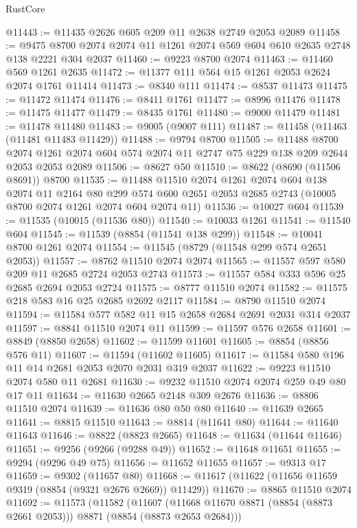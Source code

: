 \begin{lexlean}{RustCore}
\begin{coremodule}
@11443 := @11435 @2626 @605 @209 @11 @2638 @2749 @2053 @2089
@11458 := @9475 @8700 @2074 @2074 @11 @1261 @2074 @569 @604 @610 @2635 @2748 @138 @2221 @304 @2037
@11460 := @9223 @8700 @2074
@11463 := @11460 @569 @1261 @2635
@11472 := @11377 @111 @564 @15 @1261 @2053 @2624 @2074 @1761 @11414
@11473 := @8340 @111
@11474 := @8537 @11473
@11475 := @11472 @11474
@11476 := @8411 @1761
@11477 := @8996 @11476
@11478 := @11475 @11477
@11479 := @8435 @1761
@11480 := @9000 @11479
@11481 := @11478 @11480
@11483 := @9005 (@9007 @111)
@11487 := @11458 (@11463 (@11481 @11483 @11429))
@11488 := @9794 @8700
@11505 := @11488
    @8700
    @2074
    @1261
    @2074
    @604
    @574
    @2074
    @11
    @2747
    @75
    @229
    @138
    @209
    @2644
    @2053
    @2053
    @2089
@11506 := @8627 @50
@11510 := @8622 (@8690 (@11506 @8691)) @8700
@11535 := @11488
    @11510
    @2074
    @1261
    @2074
    @604
    @138
    @2074
    @11
    @2164
    @80
    @299
    @574
    @600
    @2651
    @2053
    @2685
    @2743
    (@10005 @8700 @2074 @1261 @2074 @604 @2074 @11)
@11536 := @10027 @604
@11539 := @11535 (@10015 (@11536 @80))
@11540 := @10033 @1261
@11541 := @11540 @604
@11545 := @11539 (@8854 (@11541 @138 @299))
@11548 := @10041 @8700 @1261 @2074
@11554 := @11545 (@8729 (@11548 @299 @574 @2651 @2053))
@11557 := @8762 @11510 @2074 @2074
@11565 := @11557 @597 @580 @209 @11 @2685 @2724 @2053 @2743
@11573 := @11557 @584 @333 @596 @25 @2685 @2694 @2053 @2724
@11575 := @8777 @11510 @2074
@11582 := @11575 @218 @583 @16 @25 @2685 @2692 @2117
@11584 := @8790 @11510 @2074
@11594 := @11584 @577 @582 @11 @15 @2658 @2684 @2691 @2031 @314 @2037
@11597 := @8841 @11510 @2074 @11
@11599 := @11597 @576 @2658
@11601 := @8849 (@8850 @2658)
@11602 := @11599 @11601
@11605 := @8854 (@8856 @576 @11)
@11607 := @11594 (@11602 @11605)
@11617 := @11584 @580 @196 @11 @14 @2681 @2053 @2070 @2031 @319 @2037
@11622 := @9223 @11510 @2074 @580 @11 @2681
@11630 := @9232 @11510 @2074 @2074 @259 @49 @80 @17 @11
@11634 := @11630 @2665 @2148 @309 @2676
@11636 := @8806 @11510 @2074
@11639 := @11636 @80 @50 @80
@11640 := @11639 @2665
@11641 := @8815 @11510
@11643 := @8814 (@11641 @80)
@11644 := @11640 @11643
@11646 := @8822 (@8823 @2665)
@11648 := @11634 (@11644 @11646)
@11651 := @9256 (@9266 (@9288 @49))
@11652 := @11648 @11651
@11655 := @9294 (@9296 @49 @75)
@11656 := @11652 @11655
@11657 := @9313 @17
@11659 := @9302 (@11657 @80)
@11668 := @11617 (@11622 (@11656 @11659 @9319 (@8854 (@9321 @2676 @2669)) @11429))
@11670 := @8865 @11510 @2074
@11692 := @11573
    (@11582
      (@11607 (@11668 @11670 @8871 (@8854 (@8873 @2661 @2053))) @8871 (@8854 (@8873 @2653 @2684)))

\end{coremodule}
\end{lexlean}
